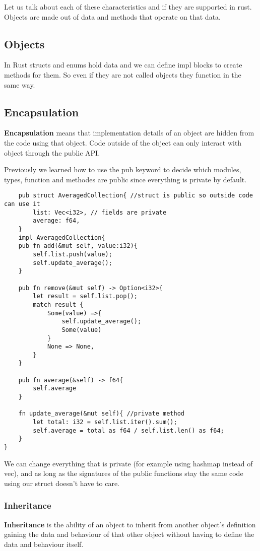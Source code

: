 Let us talk about each of these characteristics and if they are supported in rust. Objects are made out of data and methods that operate on that data. 
\subsection{Objects}
In Rust structs and enums hold data and we can define impl blocks to create methods for them. So even if they are not called objects they function in the same way.

\subsection{Encapsulation}
\begin{definition}
    \textbf{Encapsulation} means that implementation details of an object are hidden from the code using that object. Code outside of the object can only interact with object through the public API. 
\end{definition}

Previously we learned how to use the pub keyword to decide which modules, types, function and methodes are public since everything is private by default.

\begin{lstlisting}
    pub struct AveragedCollection{ //struct is public so outside code can use it
        list: Vec<i32>, // fields are private
        average: f64,
    }
    impl AveragedCollection{
    pub fn add(&mut self, value:i32){
        self.list.push(value);
        self.update_average();
    }

    pub fn remove(&mut self) -> Option<i32>{
        let result = self.list.pop();
        match result {
            Some(value) =>{
                self.update_average();
                Some(value)
            }
            None => None,
        }
    }

    pub fn average(&self) -> f64{
        self.average
    }

    fn update_average(&mut self){ //private method
        let total: i32 = self.list.iter().sum();
        self.average = total as f64 / self.list.len() as f64;
    }
}
\end{lstlisting}

We can change everything that is private (for example using hashmap instead of vec), and as long as the signatures of the public functions stay the same code using our struct doesn't have to care.
\subsubsection{Inheritance}
\begin{definition}
    \textbf{Inheritance} is the ability of an object to inherit from another object's definition gaining the data and behaviour of that other object without having to define the data and behaviour itself. 
\end{definition}

